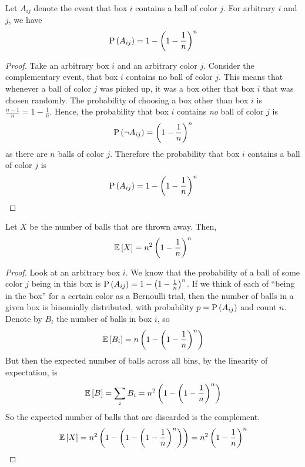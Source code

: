 \documentclass[11pt]{article}
\begin{document}
\begin{prop}
    Let $A_{ij}$ denote the event that box $i$ contains a ball of color $j$.
    For arbitrary $i$ and $j$, we have
    \begin{equation*}
        \P{A_{ij}} = 1 - \parens{1 - \frac{1}{n}}^n
    \end{equation*}
\end{prop}

\begin{proof}
    Take an arbitrary box $i$ and an arbitrary color $j$.
    Consider the complementary event, that box $i$ contains no ball of color
    $j$. This means that whenever a ball of color $j$ was picked up, it was a
    box other that box $i$ that was chosen randomly. The probability of
    choosing a box other than box $i$ is $\frac{n - 1}{n} = 1 - \frac{1}{n}$.
    Hence, the probability that box $i$ contains \emph{no} ball of color $j$ is
    \begin{equation*}
        \P{\neg A_{ij}} = \parens{1 - \frac{1}{n}}^n
    \end{equation*}
    as there are $n$ balls of color $j$.
    Therefore the probability that box $i$ contains a ball of color $j$ is
    \begin{equation*}
        \P{A_{ij}} = 1 - \parens{1 - \frac{1}{n}}^n
    \end{equation*}
\end{proof}

\begin{prop}
    Let $X$ be the number of balls that are thrown away.
    Then,
    \begin{equation*}
        \E{X} = n^2 \parens{1 - \frac{1}{n}}^n
    \end{equation*}
\end{prop}

\begin{proof}
    Look at an arbitrary box $i$. We know that the probability of a ball of
    some color $j$ being in this box is
    $\P{A_{ij}} = 1 - \parens{1 - \frac{1}{n}}^n$.
    If we think of each of ``being in the box'' for a certain color as a
    Bernoulli trial, then the number of balls in a given box is binomially
    distributed, with probability $p = \P{A_{ij}}$ and count $n$.
    Denote by $B_i$ the number of balls in box $i$, so
    \begin{equation*}
        \E{B_i} = n \parens{1 - \parens{1 - \frac{1}{n}}^n}
    \end{equation*}
    But then the expected number of balls across all bins, by the linearity of
    expectation, is
    \begin{equation*}
        \E{B}
        = \sum_i B_i
        = n^2 \parens{1 - \parens{1 - \frac{1}{n}}^n}
    \end{equation*}
    So the expected number of balls that are discarded is the complement.
    \begin{equation*}
        \E{X}
        = n^2 \parens{1 - \parens{1 - \parens{1 - \frac{1}{n}}^n}}
        = n^2 \parens{1 - \frac{1}{n}}^n
    \end{equation*}
\end{proof}
\end{document}

